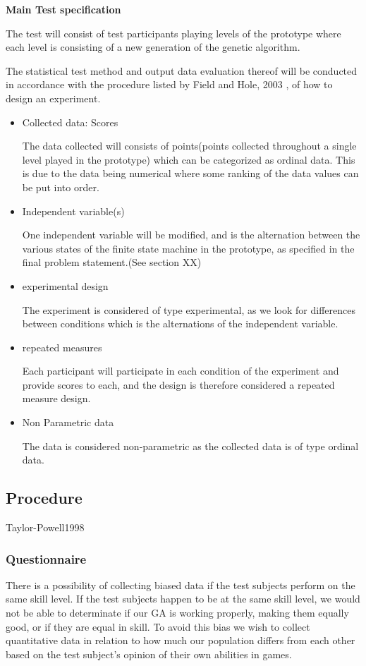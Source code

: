 \newpage
\textbf{Main Test specification}

The test will consist of test participants playing levels of the prototype where each level is consisting of a new generation of the genetic algorithm.

The statistical test method and output data evaluation thereof will be conducted in accordance with the procedure listed by Field and Hole, 2003 \cite[pp. 265-277]{Field2003}, of how to design an experiment.

\begin{itemize}
\item Collected data: Scores

The data collected will consists of points(points collected throughout a single level played in the prototype) which can be categorized as ordinal data. This is due to the data being numerical where some ranking of the data values can be put into order.
\item Independent variable(s)

One independent variable will be modified, and is the alternation between the various states of the finite state machine in the prototype, as specified in the final problem statement.(See section XX)
\item experimental design

The experiment is considered of type experimental, as we look for differences between conditions which is the alternations of the independent variable.
\item repeated measures

Each participant will participate in each condition of the experiment and provide scores to each, and the design is therefore considered a repeated measure design.
\item Non Parametric data

The data is considered non-parametric as the collected data is of type ordinal data.

\end{itemize}



\subsection{Procedure}
Taylor-Powell1998
\subsubsection{Questionnaire}
There is a possibility of collecting biased data if the test subjects perform on the same skill level.
If the test subjects happen to be at the same skill level, we would not be able to determinate if our GA is working properly, making them equally good, or if they are equal in skill. To avoid this bias we wish to collect quantitative data in relation to how much our population differs from each other based on the test subject's opinion of their own abilities in games.

